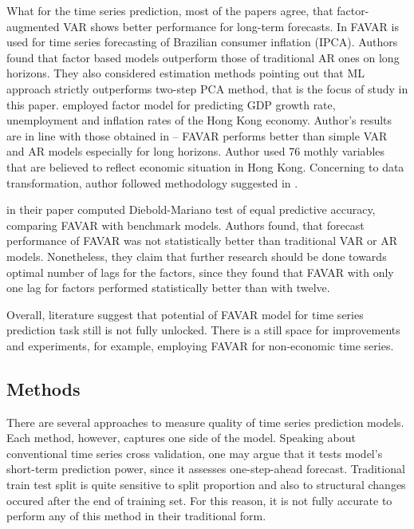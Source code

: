 \documentclass[a4paper, 14pt]{article}
\begin{document}
What for the time series prediction, most of the papers agree, that factor-augmented VAR shows better performance for long-term forecasts. In \cite{figueiredo2013forecasting} FAVAR is used for time series forecasting of Brazilian consumer inflation (IPCA). Authors found that factor based models outperform those of traditional AR ones on long horizons. They also considered estimation methods pointing out that ML approach strictly outperforms two-step PCA method, that is the focus of study in this paper. \cite{pang2010forecasting} employed factor model for predicting GDP growth rate, unemployment and inflation rates of the Hong Kong economy. Author's results are in line with those obtained in \cite{figueiredo2013forecasting} -- FAVAR performs better than simple VAR and AR models especially for long horizons. Author used 76 mothly variables that are believed to reflect economic situation in Hong Kong. Concerning to data transformation, author followed methodology suggested in \cite{stock2005implications}.

\cite{berggren2016can} in their paper computed Diebold-Mariano test of equal predictive accuracy, comparing FAVAR with benchmark models. Authors found, that forecast performance of FAVAR was not statistically better than traditional VAR or AR models. Nonetheless, they claim that further research should be done towards optimal number of lags for the factors, since they found that FAVAR with only one lag for factors performed statistically better than with twelve.  

Overall, literature suggest that potential of FAVAR model for time series prediction task still is not fully unlocked. There is a still space for improvements and experiments, for example, employing FAVAR for non-economic time series.

\subsection*{Methods}
There are several approaches to measure quality of time series prediction models. Each method, however, captures one side of the model. Speaking about conventional time series cross validation, one may argue that it tests model's short-term prediction power, since it assesses one-step-ahead forecast. Traditional train test split is quite sensitive to split proportion and also to structural changes occured after the end of training set. For this reason, it is not fully accurate to perform any of this method in their traditional form. 
\end{document}
